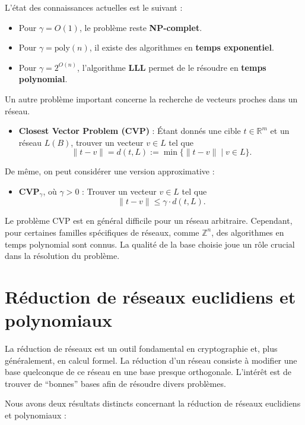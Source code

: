 \documentclass[a4paper,12pt]{report}  %
\theoremstyle{definitionstyle}
\theoremstyle{examplestyle}
\theoremstyle{remarkstyle}
\theoremstyle{propositionstyle}
\theoremstyle{theoremstyle}
\theoremstyle{proofstyle}
\begin{document}
	L’état des connaissances actuelles est le suivant :
	
	\begin{itemize}
		\item Pour $\gamma = O(1)$, le problème reste \textbf{NP-complet}.
		\item Pour $\gamma = \text{poly}(n)$, il existe des algorithmes en \textbf{temps exponentiel}.
		\item Pour $\gamma = 2^{O(n)}$, l’algorithme \textbf{LLL} permet de le résoudre en \textbf{temps polynomial}.
	\end{itemize}
	
	Un autre problème important concerne la recherche de vecteurs proches dans un réseau.
	
	\begin{itemize}
		\item \textbf{Closest Vector Problem (CVP)} : Étant donnés une cible $t \in \mathbb{R}^m$ et un réseau $L(B)$, trouver un vecteur $v \in L$ tel que 
		\[
		\|t - v\| = d(t, L) := \min \{ \|t - v\| \mid v \in L \}.
		\]
	\end{itemize}
	
	De même, on peut considérer une version approximative :
	
	\begin{itemize}
		\item \textbf{CVP$_\gamma$}, où $\gamma > 0$ : Trouver un vecteur $v \in L$ tel que 
		\[
		\|t - v\| \leq \gamma \cdot d(t, L).
		\]
	\end{itemize}
	
	Le problème CVP est en général difficile pour un réseau arbitraire. Cependant, pour certaines familles spécifiques de réseaux, comme $\mathbb{Z}^n$, des algorithmes en temps polynomial sont connus. La qualité de la base choisie joue un rôle crucial dans la résolution du problème.
		
	\section{Réduction de réseaux euclidiens et polynomiaux}
	
	
	La réduction de réseaux est un outil fondamental en cryptographie et, plus généralement, en calcul formel. La réduction d'un réseau consiste à modifier une base quelconque de ce réseau en une base presque orthogonale. L'intérêt est de trouver de ``bonnes'' bases afin de résoudre divers problèmes.
	
	Nous avons deux résultats distincts concernant la réduction de réseaux euclidiens et polynomiaux :
	
\end{document}
